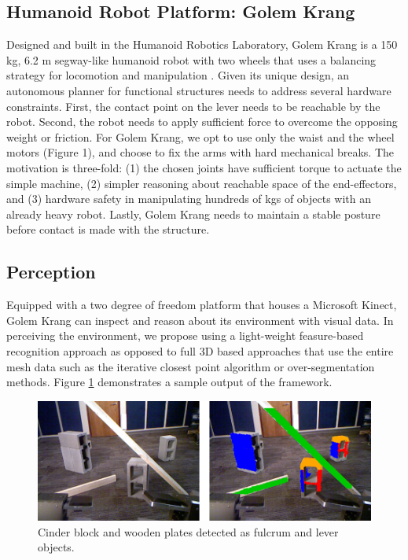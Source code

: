 \documentclass[runningheads,a4paper]{llncs}
\begin{document}
\subsection{Humanoid Robot Platform: Golem Krang}

Designed and built in the Humanoid Robotics Laboratory, Golem Krang is a 150 kg, 6.2 m segway-like
humanoid robot with two wheels that uses a balancing strategy for locomotion and manipulation \cite{stilman2010golem}.
Given its unique design, an autonomous planner for functional structures needs to address several
hardware constraints. First, the contact point on the lever needs to be reachable by the robot.
Second, the robot needs to apply sufficient force to overcome the opposing weight or friction. For
Golem Krang, we opt to use only the waist and the wheel motors (Figure 1), and choose to fix the
arms with hard mechanical breaks. The motivation is three-fold: (1) the chosen joints have
sufficient torque to actuate the simple machine, (2) simpler reasoning about reachable space of the
end-effectors, and (3) hardware safety in manipulating hundreds of kgs of objects with an already
heavy robot. Lastly, Golem Krang needs to maintain a stable posture before contact is made with the
structure.

\subsection{Perception}

Equipped with a two degree of freedom platform that houses a Microsoft Kinect, Golem Krang can
inspect and reason about its environment with visual data. In perceiving the environment, we propose
using a light-weight feasure-based recognition approach as opposed to full 3D based approaches that
use the entire mesh data such as the iterative closest point algorithm or over-segmentation methods.
Figure \ref{fig:detection} demonstrates a sample output of the framework.

\begin{figure}[ht!] 
  \centering
  \includegraphics[width=0.9\linewidth]{Figures/detection.png}
  \caption{Cinder block and wooden plates detected as fulcrum and lever objects.}
  \label{fig:detection}
\end{figure}
\end{document}
